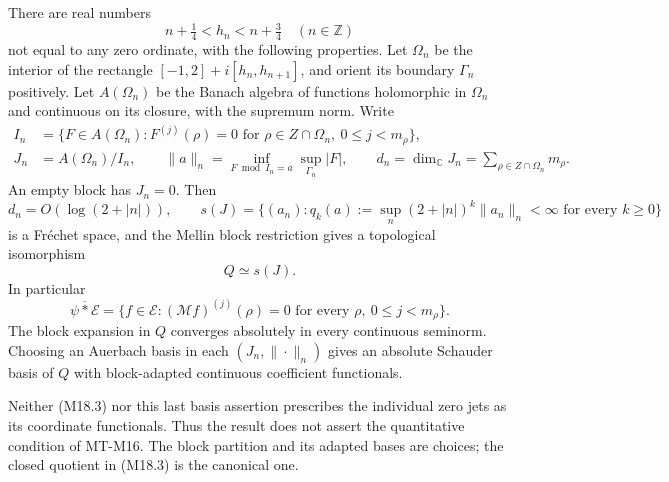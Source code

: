 There are real numbers
\[
 n+\tfrac14<h_n<n+\tfrac34\quad(n\in\mathbb Z)
\]
not equal to any zero ordinate, with the following properties.
Let \(\Omega_n\) be the interior of the rectangle
\([-1,2]+i[h_n,h_{n+1}]\), and orient its boundary
\(\Gamma_n\) positively.  Let \(A(\Omega_n)\) be the Banach
algebra of functions holomorphic in \(\Omega_n\) and continuous
on its closure, with the supremum norm.  Write
\[
 \begin{split}
 I_n&=\{F\in A(\Omega_n):
        F^{(j)}(\rho)=0\text{ for }\rho\in Z\cap\Omega_n,\
                                  0\le j<m_\rho\},\\
 J_n&=A(\Omega_n)/I_n,\qquad
 \|a\|_n=\inf_{F\bmod I_n=a}\sup_{\Gamma_n}|F|,\qquad
 d_n=\dim_{\mathbb C}J_n=\sum_{\rho\in Z\cap\Omega_n}m_\rho .
 \end{split}                                                    \tag{M18.1}
\]
An empty block has \(J_n=0\).  Then
\[
 d_n=O(\log(2+|n|)),\qquad
 s(J)=\{(a_n):q_k(a):=\sup_n(2+|n|)^k\|a_n\|_n<\infty
                                  \text{ for every }k\ge0\}      \tag{M18.2}
\]
is a Fr\'echet space, and the Mellin block restriction gives a
topological isomorphism
\[
 Q\simeq s(J).                                                    \tag{M18.3}
\]
In particular
\[
 \overline{\psi*\mathcal E}
 =\{f\in\mathcal E:(\mathcal Mf)^{(j)}(\rho)=0
                         \text{ for every }\rho,\ 0\le j<m_\rho\}.
                                                                  \tag{M18.4}
\]
The block expansion in \(Q\) converges absolutely in every
continuous seminorm.  Choosing an Auerbach basis in each
\((J_n,\|\cdot\|_n)\) gives an absolute Schauder basis of \(Q\)
with block-adapted continuous coefficient functionals.

Neither (M18.3) nor this last basis assertion prescribes the
individual zero jets as its coordinate functionals.  Thus the
result does not assert the quantitative condition of MT-M16.
The block partition and its adapted bases are choices; the
closed quotient in (M18.3) is the canonical one.

